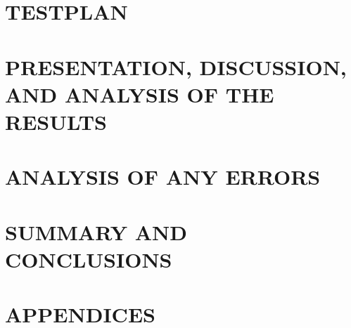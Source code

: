 \documentclass[12pt,letterpaper,onecolumn]{article}
\begin{document}
	\section{TESTPLAN}
		
	\section{PRESENTATION, DISCUSSION, AND ANALYSIS OF THE RESULTS}
		
	\section{ANALYSIS OF ANY ERRORS}
		
%		
	\section{SUMMARY AND CONCLUSIONS}
		
	\section{APPENDICES}
		
		
\end{document}
